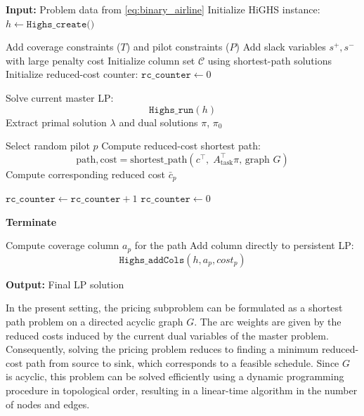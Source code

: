 \documentclass{book}
\theoremstyle{definition}
\newcounter{algorithm_}
\numberwithin{algorithm_}{chapter}
\newcommand{\alglabel}[1]{%
  \refstepcounter{algorithm_}%
  \label{#1}%
}
\begin{document}
{\begin{tcolorbox}[colback=gray!10!white, colframe=gray!80!black,
                  title=Algorithm 5.1: Column Generation with Persistent HiGHS LP Updates, sharp corners, boxrule=0.8pt]
{\begin{algorithmic}[1]
\State \textbf{Input:} Problem data from \eqref{eq:binary_airline}
\medskip
\State Initialize HiGHS instance: $h \leftarrow \texttt{Highs\_create()}$

\State Add coverage constraints ($T$) and pilot constraints ($P$)
\State Add slack variables $s^+, s^-$ with large penalty cost
\State Initialize column set $\mathcal{C}$ using shortest-path solutions
\State Initialize reduced-cost counter: $\texttt{rc\_counter} \leftarrow 0$

\medskip
\Repeat

    \State Solve current master LP:
    \[
    	\texttt{Highs\_run}(h)
    \]
    \State Extract primal solution $\lambda$ and dual solutions $\pi$, $\pi_0$

    \medskip
    \State Select random pilot $p$
    \State Compute reduced-cost shortest path:
    \[
        \text{path}, \text{cost} = \text{shortest\_path}(c^\top, \; A_{\text{task}}^\top \pi, \, \text{graph } G)
    \]
    \State Compute corresponding reduced cost $\bar{c}_p$

    \medskip
        \State $\texttt{rc\_counter} \leftarrow \texttt{rc\_counter} + 1$
    \Else
        \State $\texttt{rc\_counter} \leftarrow 0$
    \EndIf

    \medskip
        \State \textbf{Terminate}
    \EndIf

    \medskip
    \State Compute coverage column $a_p$ for the path
    \State Add column directly to persistent LP:
    \[
        \texttt{Highs\_addCols}(h, a_p, cost_p)
    \]


\State \textbf{Output:} Final LP solution

\end{algorithmic}
}
\alglabel{alg:highs_column_generation}
\end{tcolorbox}

\bigskip

In the present setting, the pricing subproblem can be formulated as a shortest path problem on a directed acyclic graph $G$. The arc weights are given by the reduced costs induced by the current dual variables of the master problem. Consequently, solving the pricing problem reduces to finding a minimum reduced-cost path from source to sink, which corresponds to a feasible schedule. Since $G$ is acyclic, this problem can be solved efficiently using a dynamic programming procedure in topological order, resulting in a linear-time algorithm in the number of nodes and edges.

}
\end{document}
